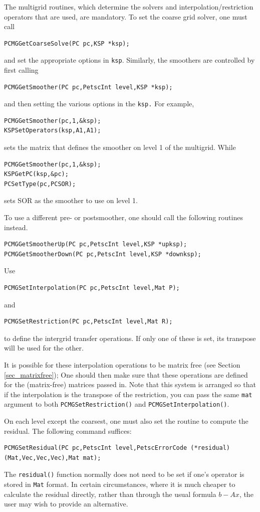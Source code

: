 The multigrid routines, which determine
the solvers and interpolation/restriction operators that are used,
are mandatory.
To set the coarse grid solver, one must 
call
\begin{lstlisting}
PCMGGetCoarseSolve(PC pc,KSP *ksp);
\end{lstlisting}
and set the appropriate options in \lstinline{ksp}. Similarly, the
smoothers are controlled by first calling
\begin{lstlisting}
PCMGGetSmoother(PC pc,PetscInt level,KSP *ksp);
\end{lstlisting}
and then setting the various options in the \lstinline{ksp.} For example,
\begin{lstlisting}
PCMGGetSmoother(pc,1,&ksp);
KSPSetOperators(ksp,A1,A1);
\end{lstlisting}
sets the matrix that defines the smoother on level 1 of the multigrid. While
\begin{lstlisting}
PCMGGetSmoother(pc,1,&ksp);
KSPGetPC(ksp,&pc);
PCSetType(pc,PCSOR);
\end{lstlisting}
sets SOR as the smoother to use on level 1.

To use a different pre- or postsmoother, one should call the following
routines instead.
\begin{lstlisting}
PCMGGetSmootherUp(PC pc,PetscInt level,KSP *upksp);
PCMGGetSmootherDown(PC pc,PetscInt level,KSP *downksp);
\end{lstlisting}

Use
\begin{lstlisting}
PCMGSetInterpolation(PC pc,PetscInt level,Mat P);
\end{lstlisting}
and
\begin{lstlisting}
PCMGSetRestriction(PC pc,PetscInt level,Mat R);
\end{lstlisting}
to define the intergrid transfer operations.  If only one of these is
set, its transpose will be used for the other.

It is possible for these interpolation operations to be matrix free
(see Section \ref{sec_matrixfree});
One should then make sure that these operations are defined for the (matrix-free) matrices
passed in.
Note that this system is arranged so that if the interpolation is
the transpose of the restriction, you can pass the same \lstinline{mat}
argument to both \lstinline{PCMGSetRestriction()} and \lstinline{PCMGSetInterpolation()}.

On each level except the coarsest, one must also set the routine to
compute the residual.  The following command suffices:
\begin{lstlisting}
PCMGSetResidual(PC pc,PetscInt level,PetscErrorCode (*residual)(Mat,Vec,Vec,Vec),Mat mat);
\end{lstlisting}
The \lstinline{residual()} function normally does not need to be set if
one's operator is stored in \lstinline{Mat} format.  In certain circumstances,
where it is much cheaper to calculate the residual directly, rather
than through the usual formula $b - Ax$,  the user may wish to provide
an alternative.

